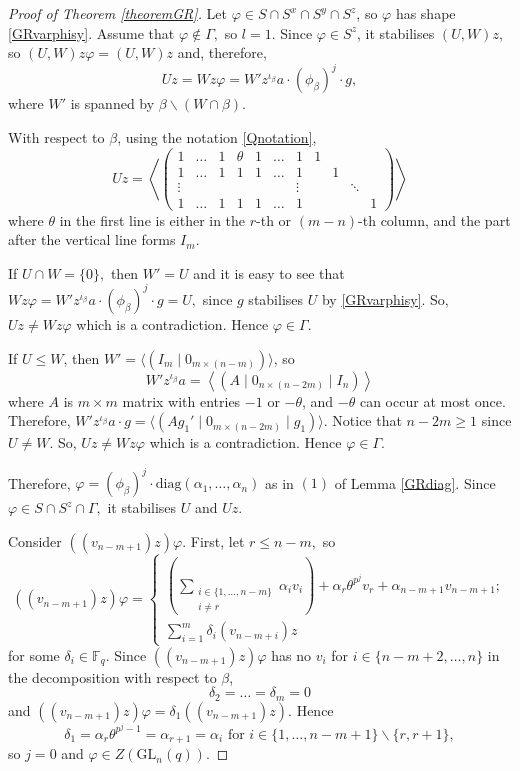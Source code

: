 \documentclass[a4paper,reqno,11pt]{amsart}
\theoremstyle{definition}
\theoremstyle{remark}
\numberwithin{equation}{section}
\newcommand{\diag}{\mathrm{diag}}
\newcommand{\GL}{{\mathrm{GL}}}
\begin{document}
\begin{proof}[Proof of Theorem {\rm \ref{theoremGR}}]
Let $\varphi \in S \cap S^x \cap S^y \cap S^z$, so $\varphi$ has shape \eqref{GRvarphisy}.   Assume that $\varphi \notin \Gamma,$ so $l=1.$ Since $\varphi \in S^z$, it stabilises $(U,W)z,$ so $(U,W)z \varphi =(U,W)z$ and, therefore, 
$$Uz=Wz \varphi = W'z^{\iota_{\beta}}a\cdot (\phi_{\beta})^j \cdot g,$$
where $W'$ is spanned by $\beta \backslash (W \cap \beta).$  

 With respect to $\beta$, using the notation \eqref{Qnotation},
$$Uz= \left \langle 
\left(\begin{array}{ccccccc|ccccc}
1 & \ldots & 1 & \theta &1 & \ldots & 1     &             1 & & &  \\
1 & \ldots & 1 &  1    &1 & \ldots & 1       &           & 1 & &  \\
\vdots &   &   &       &  &        &\vdots    &          & &\ddots & \\
1 & \ldots & 1 &  1    &1 & \ldots & 1         &         & & & 1 
\end{array}\right)
\right \rangle$$
where $\theta$ in the first line is either in the $r$-th or $(m-n)$-th column, and the part after the vertical line forms $I_m.$

 If $U \cap W=\{0\},$ then $W'=U$ and it is easy to see that $Wz \varphi = W'z^{\iota_{\beta}}a\cdot (\phi_{\beta})^j \cdot g= U,$ since $g$ stabilises $U$ by \eqref{GRvarphisy}. So, $Uz \ne Wz \varphi$ which is a contradiction. Hence $\varphi \in \Gamma.$

If $U \le W$, then $W'= \langle (I_m \mid 0_{ m \times (n-m)}) \rangle$, so 
$$W'z^{\iota_{\beta}}a= \left \langle 
(A \mid 0_{n \times (n-2m)} \mid I_n)
\right \rangle$$
where $A$ is $m \times m$ matrix with entries $-1$ or $- \theta$, and $-\theta$ can occur at most once.
Therefore, $W'z^{\iota_{\beta}}a \cdot g = \langle (A g_1'\mid0_{m \times (n-2m)}\mid g_1) \rangle$. Notice that $n-2m\ge 1$ since $U \ne W.$ So, $Uz \ne Wz \varphi$ which is a contradiction. Hence $\varphi \in \Gamma.$

Therefore, $\varphi = (\phi_{\beta})^j \cdot \diag(\alpha_1, \ldots, \alpha_n)$ as in $(1)$ of Lemma
\ref{GRdiag}. Since $\varphi \in S \cap S^z \cap \Gamma,$ it stabilises $U$ and $Uz.$  

Consider $((v_{n-m+1})z) \varphi.$ First, let $r\le n-m,$ so %
\begin{equation*}((v_{n-m+1})z) \varphi=
\begin{cases}
\left(\sum_{\substack{i \in \{1, \ldots, n-m\}\\ i \ne r}} \alpha_i v_i \right) + \alpha_r \theta^{p^j} v_r + \alpha_{n-m+1} v_{n-m+1};\\
\sum_{i=1}^m \delta_i (v_{n-m+i})z
\end{cases}
\end{equation*}
for some $\delta_i \in \mathbb{F}_q.$ Since $((v_{n-m+1})z) \varphi$ has no $v_i$ for $i \in \{n-m+2, \ldots, n\}$ in the decomposition with respect to $\beta$, 
$$\delta_2 = \ldots = \delta_m =0$$
and $((v_{n-m+1})z) \varphi= \delta_1 ((v_{n-m+1})z).$ Hence 
$$\delta_1 = \alpha_r \theta^{p^j-1}=\alpha_{r+1} = \alpha_i \text{ for } i \in \{1, \ldots, n-m+1\} \backslash \{r,r+1\},$$
so $j=0$ and $\varphi \in Z(\GL_n(q)).$


\end{proof}
\end{document}
